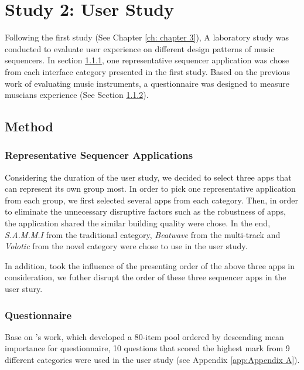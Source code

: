 \pagestyle{fancy}
\rhead{\thepage}
\chapter{Study 2: User Study}
\label{ch: chapter 4}

Following the first study (See Chapter \ref{ch: chapter 3}), A laboratory study was conducted to evaluate user experience on different design patterns of music sequencers. In section \ref{subsec: representative}, one representative sequencer application was chose from each interface category presented in the first study. Based on the previous work of evaluating music instruments, a questionnaire was designed to measure muscians experience (See Section \ref{subsec: questionnaire}).

\section{Method}
\subsection{Representative Sequencer Applications}
\label{subsec: representative}

Considering the duration of the user study, we decided to select three apps that can represent it\textquotesingle s own group most. In order to pick one representative application from each group, we first selected several apps from each category. Then, in order to eliminate the unnecessary disruptive factors such as the robustness of apps, the application shared the similar building quality were chose. In the end, \textit{S.A.M.M.I} from the traditional category, \textit{Beatwave} from the multi-track and \textit{Volotic} from the novel category were chose to use in the user study.

In addition, took the influence of the presenting order of the above three apps in consideration, we futher disrupt the order of these three sequencer apps in the user stury.

\subsection{Questionnaire}
\label{subsec: questionnaire}

Base on \citeauthor{Reference0}'s work, which developed a 80-item pool ordered by descending mean importance for questionnaire, 10 questions that scored the highest mark from 9 different categories were used in the user study (see Appendix \ref{app:Appendix A}).

